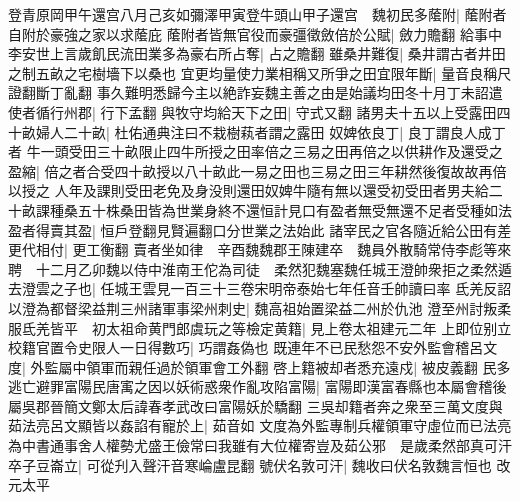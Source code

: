 登青原岡甲午還宫八月己亥如彌澤甲寅登牛頭山甲子還宫　魏初民多䕃附|{
	䕃附者自附於豪強之家以求䕃庇}
䕃附者皆無官役而豪彊徵斂倍於公賦|{
	斂力贍翻}
給事中李安世上言歲飢民流田業多為豪右所占奪|{
	占之贍翻}
雖桑井難復|{
	桑井謂古者井田之制五畝之宅樹墻下以桑也}
宜更均量使力業相稱又所爭之田宜限年斷|{
	量音良稱尺證翻斷丁亂翻}
事久難明悉歸今主以絶詐妄魏主善之由是始議均田冬十月丁未詔遣使者循行州郡|{
	行下孟翻}
與牧守均給天下之田|{
	守式又翻}
諸男夫十五以上受露田四十畝婦人二十畝|{
	杜佑通典注曰不栽樹萟者謂之露田}
奴婢依良丁|{
	良丁謂良人成丁者}
牛一頭受田三十畝限止四牛所授之田率倍之三易之田再倍之以供耕作及還受之盈縮|{
	倍之者合受四十畝授以八十畝此一易之田也三易之田三年耕然後復故故再倍以授之}
人年及課則受田老免及身没則還田奴婢牛隨有無以還受初受田者男夫給二十畝課種桑五十株桑田皆為世業身終不還恒計見口有盈者無受無還不足者受種如法盈者得賣其盈|{
	恒戶登翻見賢遍翻口分世業之法始此}
諸宰民之官各隨近給公田有差更代相付|{
	更工衡翻}
賣者坐如律　辛酉魏魏郡王陳建卒　魏員外散騎常侍李彪等來聘　十二月乙卯魏以侍中淮南王佗為司徒　柔然犯魏塞魏任城王澄帥衆拒之柔然遁去澄雲之子也|{
	任城王雲見一百三十三卷宋明帝泰始七年任音壬帥讀曰率}
氐羌反詔以澄為都督梁益荆三州諸軍事梁州刺史|{
	魏高祖始置梁益二州於仇池}
澄至州討叛柔服氐羌皆平　初太祖命黄門郎虞玩之等檢定黄籍|{
	見上卷太祖建元二年}
上即位别立校籍官置令史限人一日得數巧|{
	巧謂姦偽也}
既連年不已民愁怨不安外監會稽呂文度|{
	外監屬中領軍而親任過於領軍會工外翻}
啓上籍被却者悉充遠戍|{
	被皮義翻}
民多逃亡避罪富陽民唐㝢之因以妖術惑衆作亂攻陷富陽|{
	富陽即漢富春縣也本屬會稽後屬吳郡晉簡文鄭太后諱春孝武改曰富陽妖於驕翻}
三吳却籍者奔之衆至三萬文度與茹法亮呂文顯皆以姦諂有寵於上|{
	茹音如}
文度為外監專制兵權領軍守虛位而已法亮為中書通事舍人權勢尤盛王儉常曰我雖有大位權寄豈及茹公邪　是歲柔然部真可汗卒子豆崙立|{
	可從刋入聲汗音寒崘盧昆翻}
號伏名敦可汗|{
	魏收曰伏名敦魏言恒也}
改元太平


